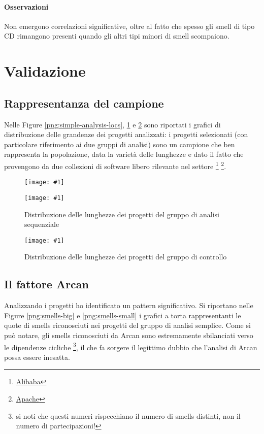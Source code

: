 \documentclass[a4paper,11pt,oneside, table]{article}
\newcommand{\putimage}[4] {
  \begin{figure}[H]
    \centering
    \texttt{[image: \#1]}
    \caption{#2}\label{#3}
  \end{figure}
}
\newcommand{\putsubimage}[5] {
  \begin{minipage}{{#4}\linewidth}
    \centering
    \texttt{[image: \#1]}
    \caption{#2}\label{#3}
  \end{minipage}
}
\newcommand{\putimagecouple}[2] {
  \begin{figure}[!htb]
    \centering
    #1
    \hspace{0.5cm}
    #2
  \end{figure}
}
\begin{document}
  \paragraph{Osservazioni}
  Non emergono correlazioni significative, oltre al fatto che spesso gli smell di tipo CD rimangono presenti quando gli altri tipi minori di smell scompaiono.

  \section{Validazione}

  \subsection{Rappresentanza del campione}

  Nelle Figure \ref{png:simple-analysis-locs}, \ref{png:sequential-analysis-locs} e \ref{png:control-group-locs} sono riportati i grafici di distribuzione delle grandenze dei progetti analizzati: i progetti selezionati (con particolare riferimento ai due gruppi di analisi) sono un campione che ben rappresenta la popolazione, data la variet\`a delle lunghezze e dato il fatto che provengono da due collezioni di software libero rilevante nel settore \footnote{\href{https://github.com/alibaba/}{Alibaba}} \footnote{\href{https://github.com/apache/}{Apache}}.

  \putimagecouple
  {\putsubimage{images/simple-analysis-locs.png}{Distribuzione delle lunghezze (in Milioni di LoC) dei progetti del gruppo di semplice}{png:simple-analysis-locs}{0.45}{1}}
  {\putsubimage{images/sequential-analysis-locs.png}{Distribuzione delle lunghezze dei progetti del gruppo di analisi sequenziale}{png:sequential-analysis-locs}{0.45}{1}}
  \putimage{images/control-group-locs.png}{Distribuzione delle lunghezze dei progetti del gruppo di controllo}{png:control-group-locs}{0.5}

  \subsection{Il fattore Arcan}

  Analizzando i progetti ho identificato un pattern significativo. Si riportano nelle Figure \ref{png:smells-big} e \ref{png:smells-small} i grafici a torta rappresentanti le quote di smells riconosciuti nei progetti del gruppo di analisi semplice. Come si pu\`o notare, gli smells riconosciuti da Arcan sono estremamente sbilanciati verso le dipendenze cicliche \footnote{si noti che questi numeri rispecchiano il numero di smells distinti, non il numero di partecipazioni!}, il che fa sorgere il legittimo dubbio che l'analisi di Arcan possa essere inesatta.
\end{document}
